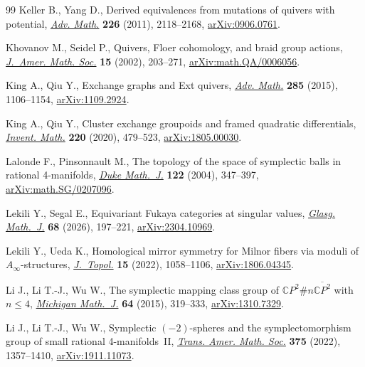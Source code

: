 \documentclass[10pt,a4paper]{amsart}
\theoremstyle{definition}
\numberwithin{equation}{section}
\begin{document}
\begin{thebibliography}{99}
Keller B., Yang D., Derived equivalences from mutations of quivers with
 potential, \href{https://doi.org/10.1016/j.aim.2010.09.019}{\textit{Adv.
 Math.}} \textbf{226} (2011), 2118--2168,
 \href{http://arxiv.org/abs/0906.0761}{arXiv:0906.0761}.

Khovanov M., Seidel P., Quivers, {F}loer cohomology, and braid group actions,
 \href{https://doi.org/10.1090/S0894-0347-01-00374-5}{\textit{J.~Amer. Math.
 Soc.}} \textbf{15} (2002), 203--271,
 \href{http://arxiv.org/abs/math.QA/0006056}{arXiv:math.QA/0006056}.

King A., Qiu Y., Exchange graphs and {E}xt quivers,
 \href{https://doi.org/10.1016/j.aim.2015.08.017}{\textit{Adv. Math.}}
 \textbf{285} (2015), 1106--1154,
 \href{http://arxiv.org/abs/1109.2924}{arXiv:1109.2924}.

King A., Qiu Y., Cluster exchange groupoids and framed quadratic differentials,
 \href{https://doi.org/10.1007/s00222-019-00932-y}{\textit{Invent. Math.}}
 \textbf{220} (2020), 479--523,
 \href{http://arxiv.org/abs/1805.00030}{arXiv:1805.00030}.

Lalonde F., Pinsonnault M., The topology of the space of symplectic balls in
 rational 4-manifolds,
 \href{https://doi.org/10.1215/S0012-7094-04-12223-7}{\textit{Duke Math.~J.}}
 \textbf{122} (2004), 347--397,
 \href{http://arxiv.org/abs/math.SG/0207096}{arXiv:math.SG/0207096}.

Lekili Y., Segal E., Equivariant {F}ukaya categories at singular values,
 \href{https://doi.org/10.1017/s0017089525100487}{\textit{Glasg. Math.~J.}}
 \textbf{68} (2026), 197--221,
 \href{http://arxiv.org/abs/2304.10969}{arXiv:2304.10969}.

Lekili Y., Ueda K., Homological mirror symmetry for {M}ilnor fibers via moduli
 of {$A_\infty$}-structures,
 \href{https://doi.org/10.1112/topo.12248}{\textit{J.~Topol.}} \textbf{15}
 (2022), 1058--1106, \href{http://arxiv.org/abs/1806.04345}{arXiv:1806.04345}.

Li J., Li T.-J., Wu W., The symplectic mapping class group of {$\mathbb
 CP^2\#n\overline{\mathbb CP^2}$} with {$n \le 4$},
 \href{https://doi.org/10.1307/mmj/1434731926}{\textit{Michigan Math.~J.}}
 \textbf{64} (2015), 319--333,
 \href{http://arxiv.org/abs/1310.7329}{arXiv:1310.7329}.

Li J., Li T.-J., Wu W., Symplectic {$(-2)$}-spheres and the symplectomorphism
 group of small rational 4-manifolds~{II},
 \href{https://doi.org/10.1090/tran/8517}{\textit{Trans. Amer. Math. Soc.}}
 \textbf{375} (2022), 1357--1410,
 \href{http://arxiv.org/abs/1911.11073}{arXiv:1911.11073}.


\end{thebibliography}
\end{document}
